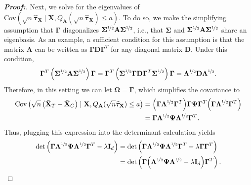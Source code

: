 \documentclass[11pt,twoside]{article}
\theoremstyle{definition}
\theoremstyle{remark}
\begin{document}
\begin{proof}[\textbf{Proof:}]
Next, we solve for the eigenvalues of $\text{Cov}\left(\sqrt{n}\widehat{\bm{\tau}}_{\mathbf{X}} \mid \mathbf{X}, Q_{\mathbf{A}}(\sqrt{n} \widehat{\bm{\tau}}_{\mathbf{X}}) \leq a \right)$. To do so, we make the simplifying assumption that $\mathbf{\Gamma}$ diagonalizes $\mathbf{\Sigma}^{\nicefrac{1}{2}} \mathbf{A} \mathbf{\Sigma}^{\nicefrac{1}{2}}$, i.e., that $\mathbf{\Sigma}$ and $\mathbf{\Sigma}^{\nicefrac{1}{2}} \mathbf{A} \mathbf{\Sigma}^{\nicefrac{1}{2}}$ share an eigenbasis. As an example, a sufficient condition for this assumption is that the matrix $\mathbf{A}$ can be written as $\mathbf{\Gamma} \mathbf{D} \mathbf{\Gamma}^T$ for any diagonal matrix $\mathbf{D}$. Under this condition,
    \begin{align*}
       \mathbf{\Gamma}^T \left( \mathbf{\Sigma}^{\nicefrac{1}{2}} \mathbf{A} \mathbf{\Sigma}^{\nicefrac{1}{2}} \right) \mathbf{\Gamma} = \mathbf{\Gamma}^T \left( \mathbf{\Sigma}^{\nicefrac{1}{2}} \mathbf{\Gamma} \mathbf{D} \mathbf{\Gamma}^T \mathbf{\Sigma}^{\nicefrac{1}{2}} \right) \mathbf{\Gamma} = \mathbf{\Lambda}^{\nicefrac{1}{2}} \mathbf{D} \mathbf{\Lambda}^{\nicefrac{1}{2}}.
    \end{align*}
    Therefore, in this setting we can let $\mathbf{\Omega} = \mathbf{\Gamma}$, which simplifies the covariance to
    \begin{align*}
        \text{Cov}\left(\sqrt{n}\left(\bar{\mathbf{X}}_T - \bar{\mathbf{X}}_C \right) \mid \mathbf{X}, Q_{\mathbf{A}}(\sqrt{n} \widehat{\bm{\tau}}_{\mathbf{X}}) \leq a \right) &= \Big( \mathbf{\Gamma} \mathbf{\Lambda}^{\nicefrac{1}{2}} \mathbf{\Gamma}^T \Big) \mathbf{\Gamma} \mathbf{\Psi} \mathbf{\Gamma}^T \Big( \mathbf{\Gamma} \mathbf{\Lambda}^{\nicefrac{1}{2}} \mathbf{\Gamma}^T \Big) \\
        &=  \mathbf{\Gamma} \mathbf{\Lambda}^{\nicefrac{1}{2}} \mathbf{\Psi} \mathbf{\Lambda}^{\nicefrac{1}{2}} \mathbf{\Gamma}^T.
    \end{align*}
Thus, plugging this expression into the determinant calculation yields
    \begin{align*}
       \text{det}\left( \mathbf{\Gamma} \mathbf{\Lambda}^{\nicefrac{1}{2}} \mathbf{\Psi} \mathbf{\Lambda}^{\nicefrac{1}{2}} \mathbf{\Gamma}^T   - \lambda \mathbf{I}_d \right) &= \text{det}\left( \mathbf{\Gamma} \mathbf{\Lambda}^{\nicefrac{1}{2}} \mathbf{\Psi} \mathbf{\Lambda}^{\nicefrac{1}{2}} \mathbf{\Gamma}^T  - \lambda \mathbf{\Gamma} \mathbf{\Gamma}^T \right) \\
        &= \text{det}\left(\mathbf{\Gamma} \Big(  \mathbf{\Lambda}^{\nicefrac{1}{2}} \mathbf{\Psi} \mathbf{\Lambda}^{\nicefrac{1}{2}}  - \lambda \mathbf{I}_d \Big) \mathbf{\Gamma}^T \right).

\end{align*}
\end{proof}
\end{document}
